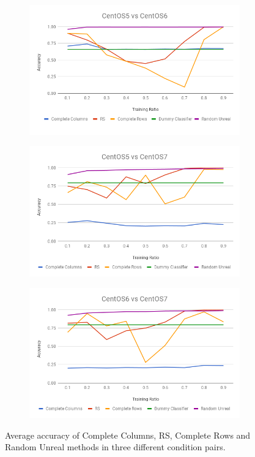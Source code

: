 \documentclass[10pt, conference, compsocconf]{IEEEtran}
\begin{document}
\begin{figure}[h!]
        \centering
        \begin{subfigure}[b]{0.8\linewidth}
                \includegraphics[width=\columnwidth]{figures/ALS/AlS-Failure-5vs6}
        \end{subfigure}
        \begin{subfigure}[b]{0.8\linewidth}
                \includegraphics[width=\columnwidth]{figures/ALS/AlS-Failure-5vs7}
        \end{subfigure}
        \begin{subfigure}[b]{0.8\linewidth}
                \includegraphics[width=\columnwidth]{figures/ALS/AlS-Failure-6vs7}
        \end{subfigure}
        \caption{Average accuracy of Complete Columns, RS, Complete Rows and Random Unreal methods in three different condition pairs.}
        \label{fig:ALS-Failure}
\end{figure}
\end{document}
